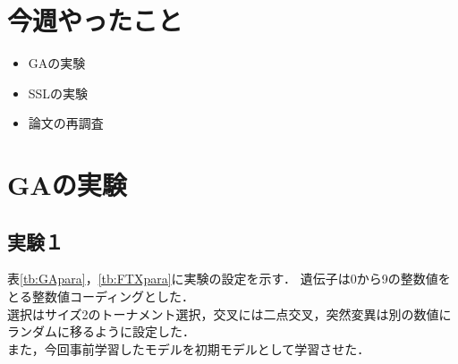 \documentclass[twocolumn]{jarticle}     %
\begin{document}


\section{今週やったこと}

\begin{itemize}
	\item GAの実験
	\item SSLの実験
	\item 論文の再調査
\end{itemize}

\section{GAの実験}
\subsection{実験１}
表\ref{tb:GApara}，\ref{tb:FTXpara}に実験の設定を示す．
遺伝子は0から9の整数値をとる整数値コーディングとした．\\
選択はサイズ2のトーナメント選択，交叉には二点交叉，突然変異は別の数値にランダムに移るように設定した．\\
また，今回事前学習したモデルを初期モデルとして学習させた．
\end{document}

